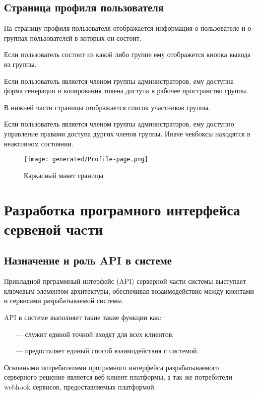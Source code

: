 \subsection{Страница профиля пользователя}

На страницу профиля пользователя отображается информация о пользователе и о группах пользователей в которых он состоит.

Если пользователь состоит из какой либо группе ему отображется кнопка выхода из группы.

Если пользователь является членом группы администраторов, ему доступна форма генерации и копирования токена доступа в рабочее пространство группы.

В нижней части страницы отображается список участников группы.

Если пользователь является членом группы администраторов, ему доступно управление правами доступа дургих членов группы. Иначе чекбоксы находятся в неактивном состоянии.

\begin{figure*}[!t]
  \centering
  \texttt{[image: generated/Profile-page.png]}
  \caption{Каркасный макет сраницы }
  \label{Profile-page}
\end{figure*}

\section{Разработка програмного интерфейса сервеной чаcти}

\subsection{Назначение и роль API в системе}

Прикладной прграммный интерфейс (API) \cite{ong2015materials} серверной части системы выступает ключевым элементом архитектуры, обеспечивая возаимодействие между киентами и сервисами разрабатываемой системы.

API в системе выполняет такие такие функции как:

\begin{itemize}
  \item[---] служит единой точной входят для всех клиентов;
  \item[---] предосталяет единый способ взаимодействия с системой.
\end{itemize}

Основными потребителями програмного интерфейса разрабатываемого серверного решение является веб-клиент платформы, а так же потребители webhook\cite{biehl2017webhooks} сервисов, предоставляемых платформой.

